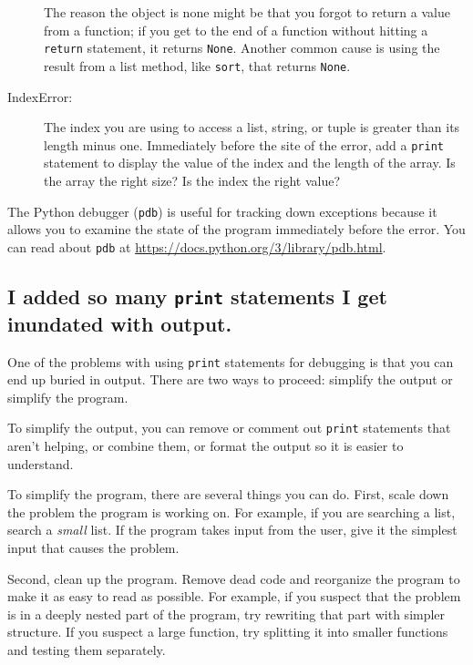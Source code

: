 \documentclass[10pt]{book}
\begin{document}
\begin{description}
The reason the object is none might be that you forgot
to return a value from a function; if you get to the end of
a function without hitting a {\tt return} statement, it returns
{\tt None}.  Another common cause is using the result from
a list method, like {\tt sort}, that returns {\tt None}.

\item[IndexError:] The index you are using
to access a list, string, or tuple is greater than
its length minus one.  Immediately before the site of the error,
add a {\tt print} statement to display
the value of the index and the length of the array.
Is the array the right size?  Is the index the right value?

\end{description}

The Python debugger ({\tt pdb}) is useful for tracking down
exceptions because it allows you to examine the state of the
program immediately before the error.  You can read
about {\tt pdb} at \url{https://docs.python.org/3/library/pdb.html}.


\subsection{I added so many {\tt print} statements I get inundated with
output.}

One of the problems with using {\tt print} statements for debugging
is that you can end up buried in output.  There are two ways
to proceed: simplify the output or simplify the program.

To simplify the output, you can remove or comment out {\tt print}
statements that aren't helping, or combine them, or format
the output so it is easier to understand.

To simplify the program, there are several things you can do.  First,
scale down the problem the program is working on.  For example, if you
are searching a list, search a {\em small} list.  If the program takes
input from the user, give it the simplest input that causes the
problem.

Second, clean up the program.  Remove dead code and reorganize the
program to make it as easy to read as possible.  For example, if you
suspect that the problem is in a deeply nested part of the program,
try rewriting that part with simpler structure.  If you suspect a
large function, try splitting it into smaller functions and testing them
separately.
\end{document}
